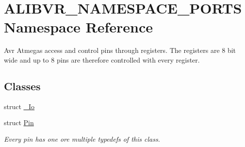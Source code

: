 \hypertarget{namespaceALIBVR__NAMESPACE__PORTS}{}\section{A\+L\+I\+B\+V\+R\+\_\+\+N\+A\+M\+E\+S\+P\+A\+C\+E\+\_\+\+P\+O\+R\+TS Namespace Reference}
\label{namespaceALIBVR__NAMESPACE__PORTS}


Avr Atmegas access and control pins through registers. The registers are 8 bit wide and up to 8 pins are therefore controlled with every register.  


\subsection*{Classes}
\begin{DoxyCompactItemize}
\item 
struct \hyperlink{structALIBVR__NAMESPACE__PORTS_1_1__Io}{\+\_\+\+Io}
\item 
struct \hyperlink{structALIBVR__NAMESPACE__PORTS_1_1Pin}{Pin}
\begin{DoxyCompactList}\small\item\em Every pin has one ore multiple typedefs of this class. \end{DoxyCompactList}\end{DoxyCompactItemize}
